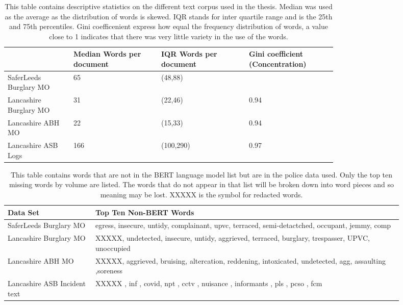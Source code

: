 \begin{table}[]
\centering
\begin{tabular}{p{0.15\linewidth}p{0.2\linewidth}p{0.2\linewidth}p{0.2\linewidth}} 
\toprule
                         & Median Words per document & IQR  Words per document & Gini coefficient (Concentration) \\\midrule
SaferLeeds Burglary MO    &          65                 &           (48,88)              &                                                          \\
Lancashire Burglary MO &          31                 &    (22,46)                     &         0.94                               \\
Lancashire ABH MO       &            22               &        (15,33)                 &            0.94                                \\ 
Lancashire ASB Logs      &           166                &         (100,290)                &           0.97                           \\  \bottomrule
\end{tabular}
\caption{\label{tab:corpus_stats} This table contains descriptive statistics on the different text corpus used in the thesis. Median was used as the average as the distribution of words is skewed. IQR stands for inter quartile range and is the 25th and 75th percentiles. Gini coefficenient express how equal the frequency distribution of words, a value close to 1 indicates that there was very little variety in the use of the words. }
\end{table}

\begin{table}[]
\centering
\begin{tabular}{p{0.2\linewidth}p{0.7\linewidth}}
\toprule
Data Set& Top Ten Non-BERT Words                                       \\ \midrule
SaferLeeds Burglary MO       &  egress, insecure, untidy, complainant, upvc, terraced, semi-detactched, occupant, jemmy, comp                                                                                        \\
Lancashire Burglary MO       & XXXXX, undetected, insecure, untidy, aggrieved, terraced, burglary, trespasser, UPVC, unoccupied \\
Lancashire ABH MO             & XXXXX, aggrieved, bruising, altercation, reddening, intoxicated, undetected, agg, assaulting ,soreness    \\
Lancashire ASB Incident text &  XXXXX , inf , covid, npt , cctv , nuisance , informants , pls , pcso , fcm       \\ \bottomrule
\end{tabular}
\caption{\label{tab:non_bert_words} This table contains words that are not in the BERT language model list but are in the police data used. Only the top ten missing words by volume are listed. The words that do not appear in that list will be broken down into word pieces and so meaning may be lost. XXXXX is the symbol for redacted words.}
\end{table}
